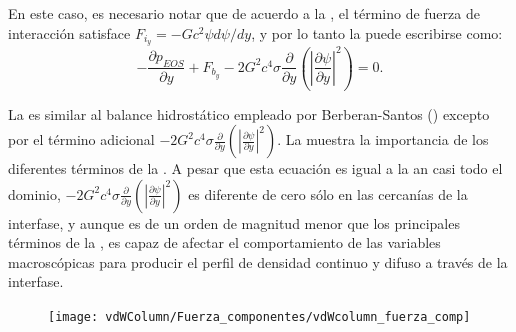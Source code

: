 En este caso, es necesario notar que de acuerdo a la , el t\'ermino de fuerza de interacci\'on satisface $F_{i_y} = -Gc^2 \psi d\psi / dy$, y por lo tanto la  puede escribirse como:
\begin{equation}
	-\dfrac{\partial p_{EOS}}{\partial y} + F_{b_y} - 2 G^2 c^4 \sigma \dfrac{\partial}{\partial y} \left( \left| \dfrac{\partial \psi}{\partial y} \right|^2  \right) = 0.
	\label{eq:li_macro_1d_peos}
\end{equation}

La  es similar al balance hidrost\'atico empleado por Berberan-Santos () excepto por el t\'ermino adicional $- 2 G^2 c^4 \sigma \frac{\partial}{\partial y} \left( \left| \frac{\partial \psi}{\partial y} \right|^2  \right)$. La  muestra la importancia de los diferentes t\'erminos de la . A pesar que esta ecuaci\'on es igual a la  an casi todo el dominio, $- 2 G^2 c^4 \sigma \frac{\partial}{\partial y} \left( \left| \frac{\partial \psi}{\partial y} \right|^2  \right)$ es diferente de cero s\'olo en las cercan\'ias de la interfase, y aunque es de un orden de magnitud menor que los principales t\'erminos de la , es capaz de afectar el comportamiento de las variables macrosc\'opicas para producir el perfil de densidad continuo y difuso a trav\'es de la interfase.


\begin{figure}[ht]
	\centering
	\texttt{[image: vdWColumn/Fuerza\_componentes/vdWcolumn\_fuerza\_comp]}
	\caption{}
	\label{fig:vdWColumn_fuerza_terminos}
\end{figure}


